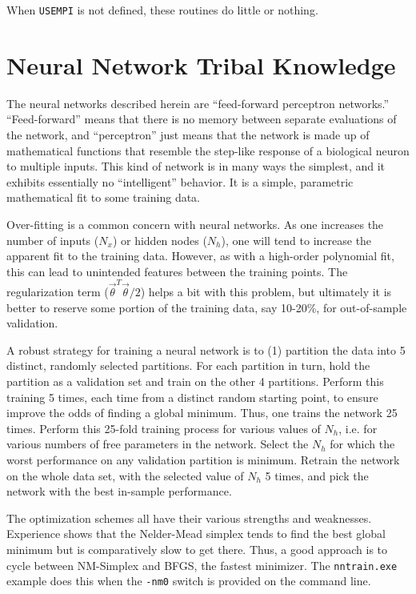 \documentclass{article}    %
\begin{document}
When \verb|USEMPI| is not defined, these routines do little or
nothing.

\section{Neural Network Tribal Knowledge}

The neural networks described herein are ``feed-forward perceptron
networks.'' ``Feed-forward'' means that there is no memory between
separate evaluations of the network, and ``perceptron'' just means
that the network is made up of mathematical functions that resemble
the step-like response of a biological neuron to multiple inputs. This
kind of network is in many ways the simplest, and it exhibits
essentially no ``intelligent'' behavior. It is a simple, parametric
mathematical fit to some training data.

Over-fitting is a common concern with neural networks. As one increases
the number of inputs ($N_x$) or hidden nodes ($N_h$), one will tend to
increase the apparent fit to the training data. However, as with a
high-order polynomial fit, this can lead to unintended features
between the training points. The regularization term
($\vec\theta^T\vec\theta/2$) helps a bit with this problem, but
ultimately it is better to reserve some portion of the training data,
say 10-20\%, for out-of-sample validation.

A robust strategy for training a neural network is to (1) partition
the data into 5 distinct, randomly selected partitions. For each
partition in turn, hold the partition as a validation set and train on
the other 4 partitions. Perform this training 5 times, each time from
a distinct random starting point, to ensure improve the odds of finding
a global minimum. Thus, one trains the network 25 times. Perform this
25-fold training process for various values of $N_h$, i.e. for various
numbers of free parameters in the network. Select the $N_h$ for which
the worst performance on any validation partition is minimum. Retrain
the network on the whole data set, with the selected value of $N_h$ 5
times, and pick the network with the best in-sample performance.

The optimization schemes all have their various strengths and
weaknesses. Experience shows that the Nelder-Mead simplex tends to
find the best global minimum but is comparatively slow to get there.
Thus, a good approach is to cycle between NM-Simplex and BFGS, the
fastest minimizer. The \verb|nntrain.exe| example does this when the
\verb|-nm0| switch is provided on the command line.
\end{document}
